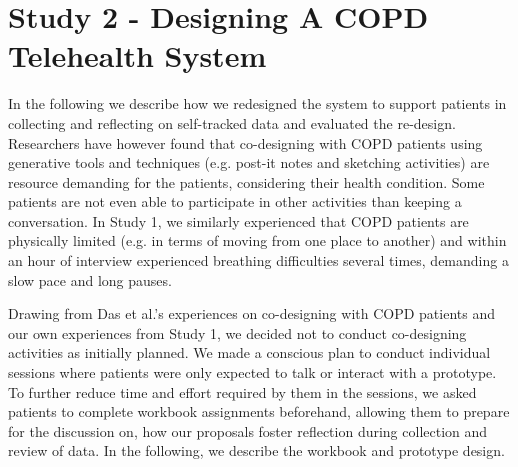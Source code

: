 \section{Study 2 - Designing A COPD Telehealth System}     
In the following we describe how we redesigned the system to support patients in collecting and reflecting on self-tracked data and evaluated the re-design. Researchers have however found that co-designing with COPD patients using generative tools and techniques (e.g. post-it notes and sketching activities) are resource demanding for the patients, considering their health condition. Some patients are not even able to participate in other activities than keeping a conversation. In Study 1, we similarly experienced that COPD patients are physically limited (e.g. in terms of moving from one place to another) and within an hour of interview experienced breathing difficulties several times, demanding a slow pace and long pauses.

Drawing from Das et al.’s experiences on co-designing with COPD patients \cite{Das} and our own experiences from Study 1, we decided not to conduct co-designing activities as initially planned. We made a conscious plan to conduct individual sessions where patients were only expected to talk or interact with a prototype. To further reduce time and effort required by them in the sessions, we asked patients to complete workbook assignments beforehand, allowing them to prepare for the discussion on, how our proposals foster reflection during collection and review of data. In the following, we describe the workbook and prototype design.

